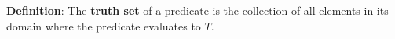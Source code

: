 {\bf Definition}: The {\bf truth  set} of a  predicate is the collection of all elements in its
domain where the predicate evaluates to $T$.